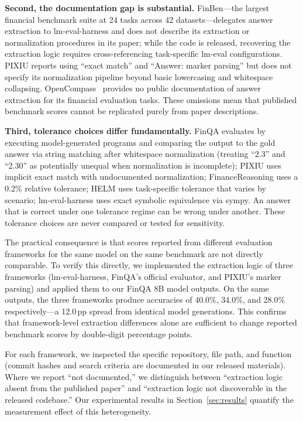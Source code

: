 \textbf{Second, the documentation gap is substantial.} FinBen---the largest financial benchmark suite at 24 tasks across 42 datasets---delegates answer extraction to lm-eval-harness and does not describe its extraction or normalization procedures in its paper; while the code is released, recovering the extraction logic requires cross-referencing task-specific lm-eval configurations. PIXIU reports using ``exact match'' and ``Answer: marker parsing'' but does not specify its normalization pipeline beyond basic lowercasing and whitespace collapsing. OpenCompass~\cite{opencompass2023} provides no public documentation of answer extraction for its financial evaluation tasks. These omissions mean that published benchmark scores cannot be replicated purely from paper descriptions.

\textbf{Third, tolerance choices differ fundamentally.} FinQA evaluates by executing model-generated programs and comparing the output to the gold answer via string matching after whitespace normalization (treating ``2.3'' and ``2.30'' as potentially unequal when normalization is incomplete); PIXIU uses implicit exact match with undocumented normalization; FinanceReasoning uses a 0.2\% relative tolerance; HELM uses task-specific tolerance that varies by scenario; lm-eval-harness uses exact symbolic equivalence via sympy. An answer that is correct under one tolerance regime can be wrong under another. These tolerance choices are never compared or tested for sensitivity.

The practical consequence is that scores reported from different evaluation frameworks for the same model on the same benchmark are not directly comparable. To verify this directly, we implemented the extraction logic of three frameworks (lm-eval-harness, FinQA's official evaluator, and PIXIU's marker parsing) and applied them to our FinQA 8B model outputs. On the same outputs, the three frameworks produce accuracies of 40.0\%, 34.0\%, and 28.0\% respectively---a 12.0\,pp spread from identical model generations. This confirms that framework-level extraction differences alone are sufficient to change reported benchmark scores by double-digit percentage points.

For each framework, we inspected the specific repository, file path, and function (commit hashes and search criteria are documented in our released materials). Where we report ``not documented,'' we distinguish between ``extraction logic absent from the published paper'' and ``extraction logic not discoverable in the released codebase.'' Our experimental results in Section~\ref{sec:results} quantify the measurement effect of this heterogeneity.

